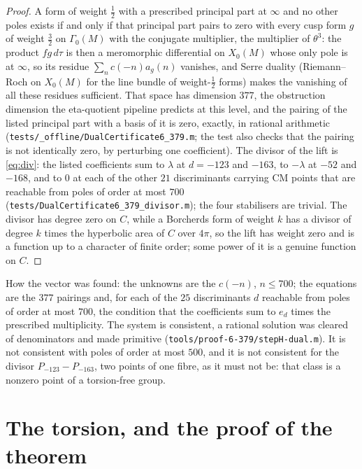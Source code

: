 \documentclass[11pt,reqno]{amsart}
\theoremstyle{plain}
\theoremstyle{definition}
\begin{document}
\begin{proof}
A form of weight $\tfrac12$ with a prescribed principal part at $\infty$ and no other poles exists
if and only if that principal part pairs to zero with every cusp form $g$ of weight $\tfrac32$ on
$\Gamma_0(M)$ with the conjugate multiplier, the multiplier of $\theta^3$: the product $fg\,d\tau$
is then a meromorphic differential on $X_0(M)$ whose only pole is at $\infty$, so its residue
$\sum_nc(-n)a_g(n)$ vanishes, and Serre duality (Riemann--Roch on $X_0(M)$ for the line bundle of
weight-$\tfrac12$ forms) makes the vanishing of all these residues sufficient. That space has
dimension $377$, the obstruction dimension the eta-quotient pipeline predicts at this level, and the
pairing of the listed principal part with a basis of it is zero, exactly, in rational arithmetic
(\texttt{tests/\_offline/DualCertificate6\_379.m}; the test also checks that the pairing is not
identically zero, by perturbing one coefficient). The divisor of the lift is \eqref{eq:div}: the
listed coefficients sum to $\lambda$ at $d=-123$ and $-163$, to $-\lambda$ at $-52$ and $-168$, and
to $0$ at each of the other $21$ discriminants carrying CM points that are reachable from poles of
order at most $700$ (\texttt{tests/DualCertificate6\_379\_divisor.m}); the four stabilisers are
trivial. The divisor has degree zero on $C$, while a Borcherds form of weight $k$ has a divisor of
degree $k$ times the hyperbolic area of $C$ over $4\pi$, so the lift has weight zero and is a
function up to a character of finite order; some power of it is a genuine function on $C$.
\end{proof}

How the vector was found: the unknowns are the $c(-n)$, $n\le700$; the equations are the
$377$ pairings and, for each of the $25$ discriminants $d$ reachable from poles of order at most
$700$, the condition that the coefficients sum to $e_d$ times the prescribed multiplicity. The
system is consistent, a rational solution was cleared of denominators and made primitive
(\texttt{tools/proof-6-379/stepH-dual.m}). It is not consistent with poles of order at most $500$,
and it is not consistent for the divisor $P_{-123}-P_{-163}$, two points of one fibre, as it must
not be: that class is a nonzero point of a torsion-free group.

\section{The torsion, and the proof of the theorem}
\end{document}
